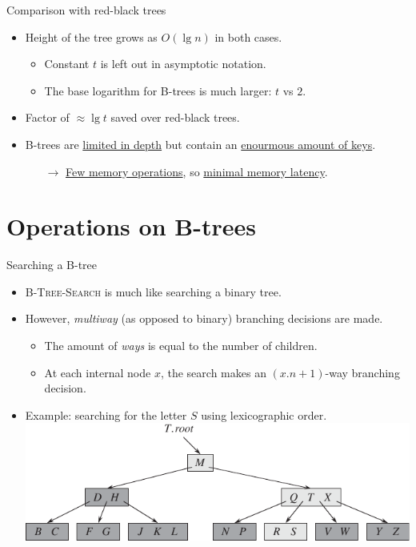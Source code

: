 \documentclass[11pt,t]{beamer}
\begin{document}
	\begin{frame}{Comparison with red-black trees}
		\begin{itemize}[<+->]
			\item Height of the tree grows as \(O(\lg n)\) in both cases.
			\begin{itemize}[<+->]
				\item Constant \(t\) is left out in asymptotic notation.
				\item The base logarithm for B-trees is much larger: \(t\) vs \(2\).
			\end{itemize}
			\item Factor of \(\approx \lg t\) saved over red-black trees.
			\item B-trees are \underline{limited in depth} but contain an \underline{enourmous amount of keys}.
			\begin{itemize}
				\item[\(\rightarrow\)] \underline{Few memory operations}, so \underline{minimal memory latency}.
			\end{itemize}
		\end{itemize}
	\end{frame}

	\section{Operations on B-trees}

	\begin{frame}{Searching a B-tree}
		\begin{itemize}[<+->]
			\item \textsc{B-Tree-Search} is much like searching a binary tree.
			\item However, \textit{multiway} (as opposed to binary) branching decisions are made.
			\begin{itemize}[<+->]
				\item The amount of \textit{ways} is equal to the number of children.
				\item At each internal node \(x\), the search makes an \((x.n+1)\)-way branching decision.
			\end{itemize}
			\item Example: searching for the letter \(S\) using lexicographic order. \vspace{0.2cm}\\
			\centering
			\hspace{1cm}\includegraphics{images/letters}
		\end{itemize}
	\end{frame}
\end{document}

